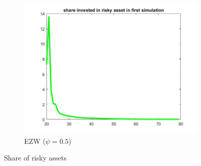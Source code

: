 \documentclass[12pt,a4paper]{article}
\begin{document}
\begin{figure}[h!]
\begin{subfigure}[b]{0.32\linewidth}
    \includegraphics[width=\linewidth]{graphs/Q4/share_ezw.jpg}
      \caption{EZW ($\psi = 0.5$)}
  \end{subfigure}
  \caption{Share of risky assets}
    \label{fig:9}
\end{figure}
\end{document}
